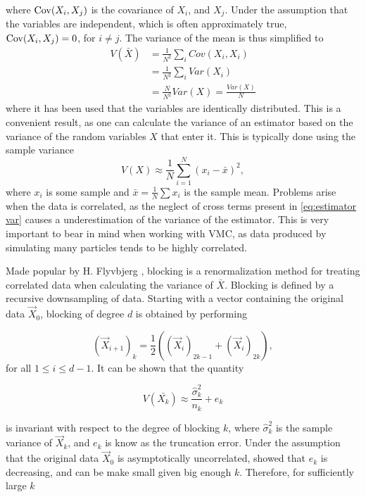 where $\mathrm{Cov}(X_i, X_j)$ is the covariance of $X_i$, and $X_j$. Under the
assumption that the variables are independent, which is often approximately
true, $\mathrm{Cov}(X_i, X_j) = 0$, for $i \neq j$. The variance of the mean is thus simplified to 
\begin{align*}
  V(\bar{X}) &= \frac{1}{N^2}\sum_{i}{Cov(X_i, X_i)} \\
  &= \frac{1}{N^2}\sum_{i}{Var(X_i)} \\
	&=\frac{N}{N^2}Var(X) = \frac{Var(X)}{N}
\end{align*}
where it has been used that the variables are identically distributed.
This is a convenient result, as one can calculate the variance of an estimator
based on the variance of the random variables $X$ that enter it. This is typically done using the sample variance
\begin{equation*}
	V(X) \approx \frac{1}{N}\sum_{i=1}^{N}{(x_i - \bar{x})^2},
\end{equation*}
where $x_i$ is some sample and $\bar{x} = \frac{1}{N}\sum{x_i}$ is the sample mean.
Problems arise when the data is correlated, as the neglect of cross terms
present in \autoref{eq:estimator var} causes a underestimation of the variance
of the estimator. This is very important to bear in mind when working with VMC,
as data produced by simulating many particles tends to be highly correlated. 


Made popular by H. Flyvbjerg \cite{Blocking}, blocking is a renormalization method for treating correlated data when calculating the variance of $\bar{X}$. Blocking is defined by a recursive downsampling of data. Starting with a vector containing the original data $\vec{X}_0$, blocking of degree $d$ is obtained by performing

\begin{equation*}
	\left(\vec{X}_{i+1}\right)_k = \frac{1}{2}\left(\left(\vec{X}_{i}\right)_{2k -1} + \left(\vec{X}_{i}\right)_{2k}\right),
\end{equation*}
for all $1 \leq i \leq d-1$. 
\newline
It can be shown that the quantity 

\begin{equation*}
	V(\bar{X_k}) \approx \frac{\hat{\sigma}_k^2}{n_k} +  e_k
\end{equation*}

is invariant with respect to the degree of blocking $k$, where $\hat{\sigma}_k^2$ is the sample variance of $\vec{X}_k$, and $e_k$ is know as the truncation error. Under the assumption that the original data $\vec{X}_0$ is asymptotically uncorrelated, \cite{Blocking} showed that $e_k$ is decreasing, and can be make small given big enough $k$. Therefore, for sufficiently large $k$

